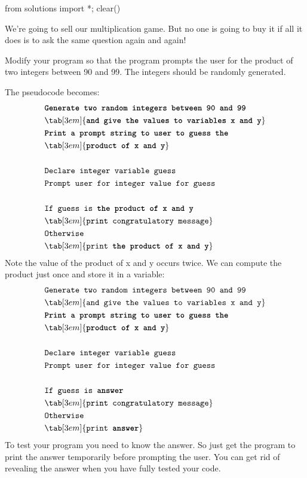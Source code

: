 \begin{python0}
from solutions import *; clear()
\end{python0}

We're going to sell our multiplication game. But no one
is going to buy it if all it does is to ask the same question again and
again!

Modify your program so that the program prompts the user for the product
of two integers between 90 and 99. The integers should be randomly
generated.

The pseudocode becomes:
\begin{align*}
&\textbf{\texttt{Generate two random integers between 90 and 99}}\\
&\tab[3em]{\texttt{\textbf{and give the values to variables x and y}}}\\
&\textbf{\texttt{Print a prompt string to user to guess the}}\\
&\tab[3em]{\texttt{\textbf{product of x and y}}}\\\\
&\texttt{Declare integer variable guess}\\
&\texttt{Prompt user for integer value for guess}\\\\
&\texttt{If guess is \textbf{the product of x and y}}\\
&\tab[3em]{\texttt{print congratulatory message}}\\
&\texttt{Otherwise}\\
&\tab[3em]{\texttt{print \textbf{the product of x and y}}}\\
\end{align*}
Note the value of the product of x and y occurs twice. We can compute
the product just once and store it in a variable:
\begin{align*}
&{\texttt{Generate two random integers between 90 and 99}}\\
&\tab[3em]{\texttt{{and give the values to variables x and y}}}\\
&\textbf{\texttt{Print a prompt string to user to guess the}}\\
&\tab[3em]{\texttt{\textbf{product of x and y}}}\\\\
&\texttt{Declare integer variable guess}\\
&\texttt{Prompt user for integer value for guess}\\\\
&\texttt{If guess is \textbf{answer}}\\
&\tab[3em]{\texttt{print congratulatory message}}\\
&\texttt{Otherwise}\\
&\tab[3em]{\texttt{print \textbf{answer}}}
\end{align*}
To test your program you need to know the answer. So just get the
program to print the answer temporarily before prompting the user. You
can get rid of revealing the answer when you have fully tested your
code.

